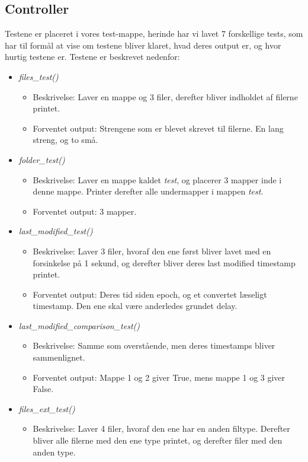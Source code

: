 \documentclass[11pt]{article}
\begin{document}
\subsection{Controller}
Testene er placeret i vores test-mappe, herinde har vi lavet 7 forskellige tests, som har til formål at vise om testene bliver klaret, hvad deres output er, og hvor hurtig testene er. Testene er beskrevet nedenfor:
\begin{itemize}
\item \textit{files\_test()}
  \begin{itemize}
  \item Beskrivelse: Laver en mappe og 3 filer, derefter bliver indholdet af filerne printet.
  \item Forventet output: Strengene som er blevet skrevet til filerne. En lang streng, og to små.
  \end{itemize}
\item \textit{folder\_test()}
  \begin{itemize}
  \item Beskrivelse: Laver en mappe kaldet \textit{test}, og placerer 3 mapper inde i denne mappe. Printer derefter alle undermapper i mappen \textit{test}.
  \item Forventet output: 3 mapper.
  \end{itemize}
\item \textit{last\_modified\_test()}
  \begin{itemize}
  \item Beskrivelse: Laver 3 filer, hvoraf den ene først bliver lavet med en forsinkelse på 1 sekund, og derefter bliver deres last modified timestamp printet.
  \item Forventet output: Deres tid siden epoch, og et convertet læseligt timestamp. Den ene skal være anderledes grundet delay.
  \end{itemize}
\item \textit{last\_modified\_comparison\_test()}
  \begin{itemize}
  \item Beskrivelse: Samme som overstående, men deres timestamps bliver sammenlignet.
  \item Forventet output: Mappe 1 og 2 giver True, mens mappe 1 og 3 giver False.
  \end{itemize}
\item \textit{files\_ext\_test()}
  \begin{itemize}
  \item Beskrivelse: Laver 4 filer, hvoraf den ene har en anden filtype. Derefter bliver alle filerne med den ene type printet, og derefter filer med den anden type.

\end{itemize}
\end{itemize}
\end{document}
